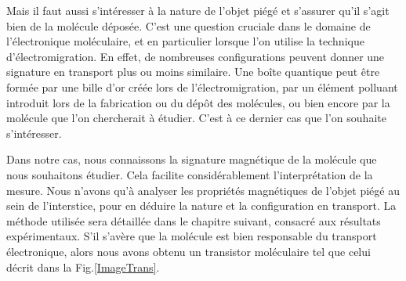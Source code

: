 Mais il faut aussi s'intéresser à la nature de l'objet piégé et s'assurer qu'il s'agit bien de la molécule déposée. C'est une question cruciale dans le domaine de l'électronique moléculaire, et en particulier lorsque l'on utilise la technique d'électromigration. En effet, de nombreuses configurations peuvent donner une signature en transport plus ou moins similaire. Une boîte quantique peut \^etre formée par une bille d'or créée lors de l'électromigration, par un élément polluant introduit lors de la fabrication ou du dép\^ot des molécules, ou bien encore par la molécule que l'on chercherait à étudier. C'est à ce dernier cas que l'on souhaite s'intéresser.

Dans notre cas, nous connaissons la signature magnétique de la molécule que nous souhaitons étudier. Cela facilite considérablement l'interprétation de la mesure. Nous n'avons qu'à analyser les propriétés magnétiques de l'objet piégé au sein de l'interstice, pour en déduire la nature et la configuration en transport. La méthode utilisée sera détaillée dans le chapitre suivant, consacré aux résultats expérimentaux.  S'il s'avère que la molécule est bien responsable du transport électronique, alors nous avons obtenu un transistor moléculaire tel que celui décrit dans la Fig.\ref{ImageTrans}.


